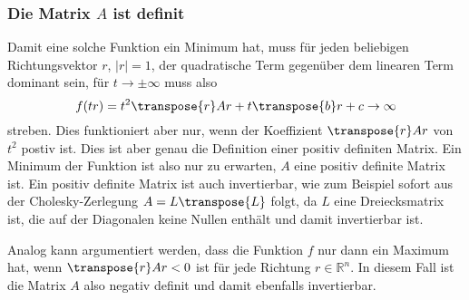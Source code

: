 \subsubsection{Die Matrix $A$ ist definit}
Damit eine solche Funktion ein Minimum hat, muss für jeden beliebigen
Richtungsvektor $r$, $|r|=1$, der quadratische Term gegenüber dem
linearen Term dominant sein, für $t\to\pm\infty$ muss also
\[
f(tr)
=
t^2
\transpose{r}Ar
+
t
\transpose{b}r
+
c
\to \infty
\]
streben.
Dies funktioniert aber nur, wenn der Koeffizient $\transpose{r}Ar$ von
$t^2$ postiv ist.
Dies ist aber genau die Definition einer positiv definiten Matrix.
Ein Minimum der Funktion ist also nur zu erwarten, $A$ eine positiv
definite Matrix ist.
Ein positiv definite Matrix ist auch invertierbar, wie zum Beispiel
sofort aus der Cholesky-Zerlegung $A=L\transpose{L}$ folgt, da $L$
eine Dreiecksmatrix ist, die auf der Diagonalen keine Nullen enthält
und damit invertierbar ist.

Analog kann argumentiert werden, dass die Funktion $f$ nur dann
ein Maximum hat, wenn $\transpose{r}Ar<0$ ist für jede Richtung
$r\in\mathbb{R}^n$.
In diesem Fall ist die Matrix $A$ also negativ definit und damit
ebenfalls invertierbar.


%
%

